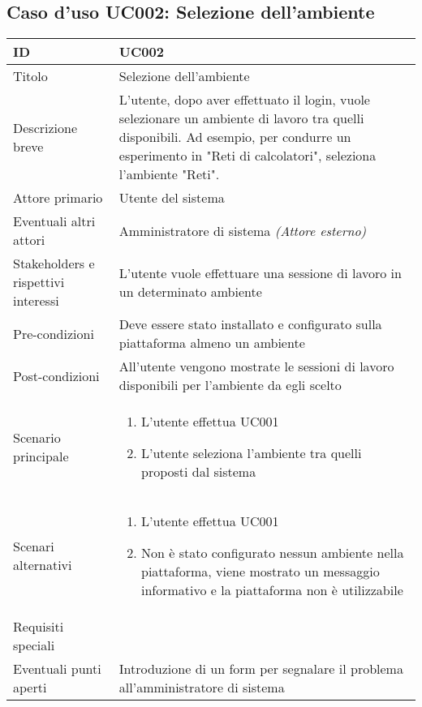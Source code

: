 \documentclass[../../main.tex]{subfiles}
\begin{document}
\subsection{Caso d’uso UC002: Selezione dell'ambiente }
\begin{tabularx}{150mm}{|l|X|}
    \hline
    ID                                  & \textbf{UC002}\\
    \hline
    Titolo                              & Selezione dell'ambiente \\
    \hline
    Descrizione breve                   & L'utente, dopo aver effettuato il login, vuole selezionare un ambiente di lavoro tra quelli disponibili. Ad esempio, per condurre un esperimento in "Reti di calcolatori", seleziona l'ambiente "Reti".   \\
    \hline
    Attore primario                     & Utente del sistema
    \\
    \hline
    Eventuali altri attori              & Amministratore di sistema \textit{(Attore esterno)}   \\
    \hline
    Stakeholders e rispettivi interessi & L'utente vuole effettuare una sessione di lavoro in un determinato ambiente   \\
    \hline
    Pre-condizioni                      & Deve essere stato installato e configurato sulla piattaforma almeno un ambiente   \\
    \hline
    Post-condizioni                     & All'utente vengono mostrate le sessioni di lavoro disponibili per l'ambiente da egli scelto  \\
    \hline
    Scenario principale                 & \parbox[t][2.4cm]{8cm}{\begin{enumerate}
        \item L'utente effettua UC001
        \item L'utente seleziona l'ambiente tra quelli proposti dal sistema
\end{enumerate}}
            \\
    \hline
    Scenari alternativi                 & \parbox[t][2.4cm]{8cm}{\begin {enumerate}
        \item L'utente effettua UC001
        \item Non è stato configurato nessun ambiente nella piattaforma, viene mostrato un messaggio informativo e la piattaforma non è utilizzabile
\end{enumerate}}
            \\
    \hline
    Requisiti speciali                  &    \\
    \hline
    Eventuali punti aperti              &    Introduzione di un form per segnalare il problema all'amministratore di sistema \\
    \hline
\end{tabularx}
\newpage
\end{document}
